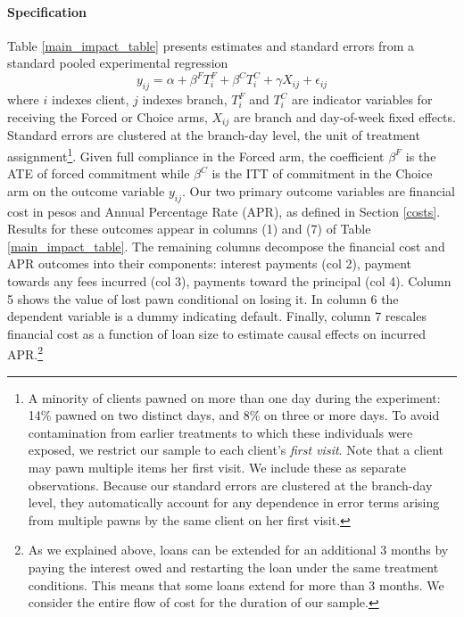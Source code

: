 \documentclass[12pt, a4paper]{article}
\begin{document}
\paragraph*{Specification} Table \ref{main_impact_table} presents estimates and standard errors from a standard pooled experimental regression 
\begin{equation} \label{basic_reg}
    y_{ij} = \alpha + \beta^F T_{i}^F + \beta^C T_{i}^C + \gamma X_{ij} + \epsilon_{ij}
\end{equation}
where $i$ indexes client, $j$ indexes branch, $T_{i}^F$ and $T_{i}^C$ are indicator variables for receiving the Forced or Choice arms, $X_{ij}$ are branch and day-of-week fixed effects. Standard errors are clustered at the branch-day level, the unit of treatment assignment\footnote{A minority of clients pawned on more than one day during the experiment: 14\% pawned on two distinct days, and 8\% on three or more days. To avoid contamination from earlier treatments to which these individuals were exposed, we restrict our sample to each client's \emph{first visit}. Note that a client may pawn multiple items her first visit. We include these as separate observations. Because our standard errors are clustered at the branch-day level, they automatically account for any dependence in error terms arising from multiple pawns by the same client on her first visit.}.
Given full compliance in the Forced arm, the coefficient $\beta^F$ is the ATE of forced commitment while $\beta^C$ is the ITT of commitment in the Choice arm on the outcome variable $y_{ij}$.
Our two primary outcome variables are financial cost in pesos and Annual Percentage Rate (APR), as defined in Section \ref{costs}. 
Results for these outcomes appear in columns (1) and (7) of Table \ref{main_impact_table}.
The remaining columns decompose the financial cost and APR outcomes into their components: interest payments (col 2), payment towards any fees incurred (col 3), payments toward the principal (col 4). Column 5 shows the value of lost pawn conditional on losing it.  In column 6 the dependent variable is a dummy indicating default.  Finally, column 7 rescales financial cost as a function of loan size to estimate causal effects on incurred APR.\footnote{As we explained above, loans can be extended for an additional 3 months by paying the interest owed and restarting the loan under the same treatment conditions. This means that some loans extend for more than 3 months. We consider the entire flow of cost for the duration of our sample.}  
\end{document}
